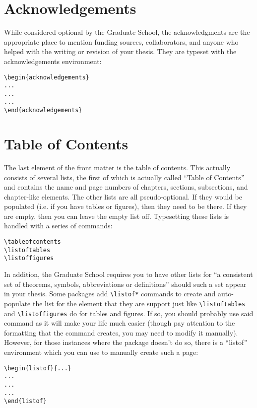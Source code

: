 \section{Acknowledgements}
While considered optional by the Graduate School, the acknowledgments are the appropriate place to mention funding sources, collaborators, and anyone who helped with the writing or revision of your thesis.  They are typeset with the acknowledgements environment:

\begin{verbatim}
\begin{acknowledgements}
...
...
...
\end{acknowledgements}
\end{verbatim}

\section{Table of Contents}
The last element of the front matter is the table of contents.  This actually consists of several lists, the first of which is actually called ``Table of Contents'' and contains the name and page numbers of chapters, sections, subsections, and chapter-like elements.  The other lists are all pseudo-optional.  If they would be populated (i.e. if you have tables or figures), then they need to be there.  If they are empty, then you can leave the empty list off.  Typesetting these lists is handled with a series of commands:

\begin{verbatim}
\tableofcontents
\listoftables
\listoffigures
\end{verbatim}

In addition, the Graduate School requires you to have other lists for ``a consistent set of theorems, symbols, abbreviations or definitions'' should such a set appear in your thesis.  Some packages add \verb=\listof*= commands to create and auto-populate the list for the element that they are support just like \verb=\listoftables= and \verb=\listoffigures= do for tables and figures.  If so, you should probably use said command as it will make your life much easier (though pay attention to the formatting that the command creates, you may need to modify it manually).  However, for those instances where the package doesn't do so, there is a ``listof'' environment which you can use to manually create such a page:

\begin{verbatim}
\begin{listof}{...}
...
...
...
\end{listof}
\end{verbatim}

